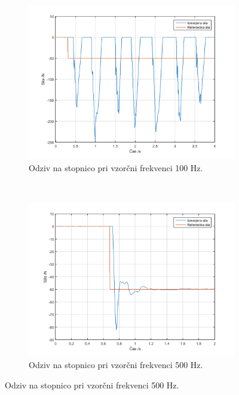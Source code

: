 \documentclass[a4paper]{article}
\begin{document}
\begin{figure}[!h]
	
	   \begin{subfigure}[b]{0.5\textwidth}
	   	\includegraphics[width=\textwidth]{./slike/figure_0_hz_100dt}

	   	\caption{Odziv na stopnico pri vzorčni frekvenci 100 Hz.}
	   	\label{fig:0hzgraph100}
	   \end{subfigure}
	   ~ %
	   \begin{subfigure}[b]{0.5\textwidth}
	   	\includegraphics[width=\textwidth]{./slike/figure_0_hz_5}
	   	\caption{Odziv na stopnico pri vzorčni frekvenci 500 Hz.}
	   	\label{fig:0hzgraph500}
	   \end{subfigure}
	
\end{figure}
\end{document}
